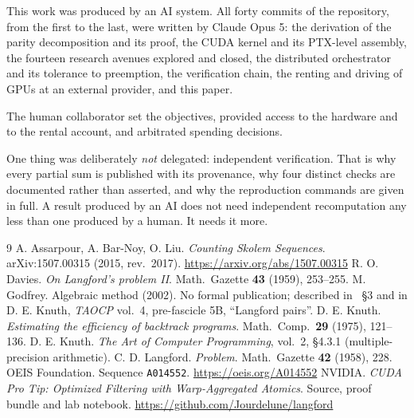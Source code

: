 \documentclass[11pt,a4paper]{article}
\begin{document}
This work was produced by an AI system. All forty commits of the repository,
from the first to the last, were written by Claude Opus 5: the derivation of the
parity decomposition and its proof, the CUDA kernel and its PTX-level assembly,
the fourteen research avenues explored and closed, the distributed orchestrator
and its tolerance to preemption, the verification chain, the renting and driving
of GPUs at an external provider, and this paper.

The human collaborator set the objectives, provided access to the hardware and
to the rental account, and arbitrated spending decisions.

One thing was deliberately \emph{not} delegated: independent verification. That
is why every partial sum is published with its provenance, why four distinct
checks are documented rather than asserted, and why the reproduction commands
are given in full. A result produced by an AI does not need independent
recomputation any less than one produced by a human. It needs it more.

\begin{thebibliography}{9}
 A. Assarpour, A. Bar-Noy, O. Liu.
  \emph{Counting Skolem Sequences}. arXiv:1507.00315 (2015, rev.\ 2017).
  \url{https://arxiv.org/abs/1507.00315}
 R. O. Davies. \emph{On Langford's problem II}.
  Math.\ Gazette \textbf{43} (1959), 253--255.
 M. Godfrey. Algebraic method (2002). No formal publication;
  described in~\cite{abl} §3 and in D. E. Knuth, \emph{TAOCP} vol.~4,
  pre-fascicle 5B, ``Langford pairs''.
 D. E. Knuth. \emph{Estimating the efficiency of backtrack
  programs}. Math.\ Comp.\ \textbf{29} (1975), 121--136.
 D. E. Knuth. \emph{The Art of Computer Programming}, vol.~2,
  §4.3.1 (multiple-precision arithmetic).
 C. D. Langford. \emph{Problem}.
  Math.\ Gazette \textbf{42} (1958), 228.
 OEIS Foundation. Sequence \texttt{A014552}.
  \url{https://oeis.org/A014552}
 NVIDIA. \emph{CUDA Pro Tip: Optimized Filtering with
  Warp-Aggregated Atomics}.
 Source, proof bundle and lab notebook.
  \url{https://github.com/Jourdelune/langford}
\end{thebibliography}
\end{document}
